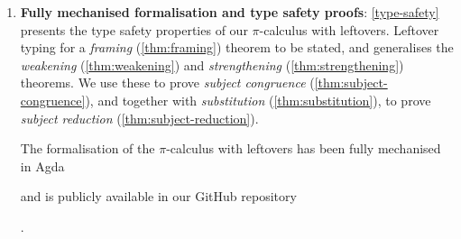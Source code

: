 \documentclass[sigplan,10pt,anonymous,review]{acmart}
\theoremstyle{definition}
\newcommand{\picalc}{$\pi$-calculus}
\begin{document}
\begin{enumerate}
\begin{itemize}
    Multiple algebras can be simultaneously used in a single type system --- usage contexts keep information about what algebra to use on which element (\autoref{contexts}).
    This allows for type systems combining linear, graded and shared types.
    
    \item \textbf{\picalc{} with leftovers}: Our type system uses \emph{leftover typing} to model the resource-aware \picalc{} (\autoref{leftover-typing}).
    This approach adds a leftover usage context to the typing judgements.
    Typing derivations take the resources of their input usage context, consume some of them, and leave the rest as leftovers in the output usage context.

    Leftover typing \textbf{makes top-down context splits unnecessary}, allows for a \emph{framing} (\autoref{thm:framing}) theorem to be stated, and makes it possible to generalise the \emph{weakening} (\autoref{thm:weakening}) and \emph{strengthening} (\autoref{thm:strengthening}) theorems.
  \end{itemize}

  \item \textbf{Fully mechanised formalisation and type safety proofs}:
    \autoref{type-safety} presents the type safety properties of our \picalc{} with leftovers.
    Leftover typing for a \emph{framing} (\autoref{thm:framing}) theorem to be stated, and generalises the \emph{weakening} (\autoref{thm:weakening}) and \emph{strengthening} (\autoref{thm:strengthening}) theorems.
    We use these to prove \emph{subject congruence} (\autoref{thm:subject-congruence}), and together with \emph{substitution} (\autoref{thm:substitution}), to prove \emph{subject reduction} (\autoref{thm:subject-reduction}).  

    The formalisation of the \picalc{} with leftovers has been fully mechanised in Agda%
\begin{anonsuppress}
and is publicly available in our GitHub repository \cite{Zalakain2020Agda}
\end{anonsuppress}
.
\end{enumerate}
\end{document}
